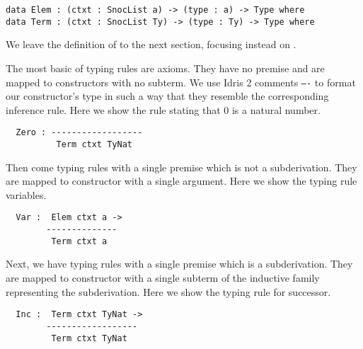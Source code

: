 \begin{minipage}{0.10\textwidth}
\varRule
\inferenceRule
\end{minipage}\hfill
\begin{minipage}{0.80\textwidth}
\begin{Verbatim}
data Elem : (ctxt : SnocList a) -> (type : a) -> Type where
data Term : (ctxt : SnocList Ty) -> (type : Ty) -> Type where
\end{Verbatim}
\end{minipage}

We leave the definition of  to the next section,
focusing instead on .

The most basic of typing rules are axioms. They have no premise
and are mapped to constructors with no subterm. We use Idris 2
comments \texttt{----} to format our constructor's type in such
a way that they resemble the corresponding inference rule.
%
Here we show the rule stating that $0$ is a natural number.

\begin{minipage}{0.45\textwidth}
\inferenceZero
\end{minipage}\hfill
\begin{minipage}{0.45\textwidth}
\begin{Verbatim}
  Zero : ------------------
          Term ctxt TyNat
\end{Verbatim}
\end{minipage}

Then come typing rules with a single premise which is not a subderivation.
They are mapped to constructor with a single argument. Here we show the
typing rule variables.

\begin{minipage}{0.45\textwidth}
\inferenceVar
\end{minipage}\hfill
\begin{minipage}{0.45\textwidth}
\begin{Verbatim}
  Var :  Elem ctxt a ->
        --------------
         Term ctxt a
\end{Verbatim}
\end{minipage}

Next, we have typing rules with a single premise which is a subderivation.
They are mapped to constructor with a single subterm of the inductive family
representing the subderivation.
%
Here we show the typing rule for successor.

\begin{minipage}{0.45\textwidth}
\inferenceInc
\end{minipage}\hfill
\begin{minipage}{0.45\textwidth}
\begin{Verbatim}
  Inc :  Term ctxt TyNat ->
        ------------------
         Term ctxt TyNat
\end{Verbatim}
\end{minipage}

